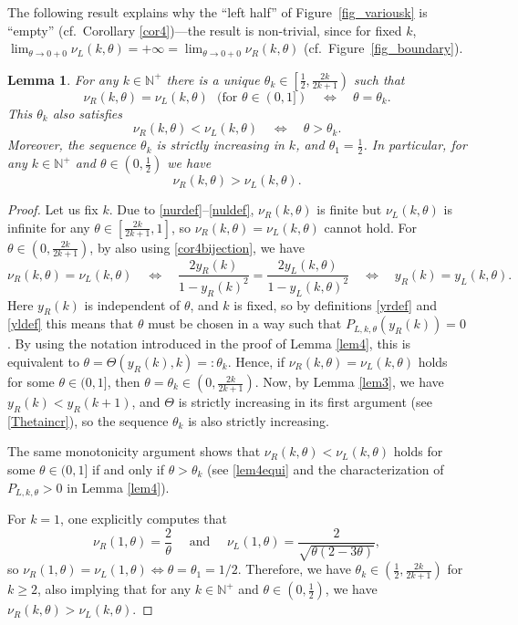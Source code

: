 \documentclass[smallextended,numbook,runningheads]{svjour3}     %
\newtheorem{lemma}{Lemma}
\newtheorem{lemma}{Lemma}
\newcommand{\te}{\theta}
\newcommand{\nul}{\nu_L(k,\theta)}
\newcommand{\nur}{\nu_R(k,\theta)}
\newcommand{\yl}{y_L(k,\theta)}
\newcommand{\yr}{y_R(k)}
\newcommand{\nplus}{\mathbb{N}^+}
\begin{document}
The following result explains why the ``left half'' of Figure~\ref{fig_variousk} is ``empty'' (cf.~Corollary \ref{cor4})---the result is non-trivial, since for fixed $k$, $\lim_{\te\to 0+0} \nul=+\infty=\lim_{\te\to 0+0} \nur$ (cf.~Figure~\ref{fig_boundary}).
\begin{lemma}\label{lem5} For any $k\in\nplus$ there is a unique $\te_k\in\left[\frac{1}{2},\frac{2k}{2k+1}\right)$  such that 
\[
\nur = \nul\ \ \  (\text{for } \te\in(0,1])\quad \Longleftrightarrow \quad \te= \te_k.
\]
This $\te_k$ also satisfies
\[
\nur < \nul\quad \Longleftrightarrow \quad \te> \te_k.
\]
Moreover, the sequence $\te_k$ is strictly increasing in $k$, and  $\te_1=\frac{1}{2}$. In particular, for any $k\in\nplus$ and $\te\in\left(0,\frac{1}{2}\right)$ we have 
\[
 \nur>\nul.
\] 
\end{lemma}
\begin{proof} Let us fix $k$. Due to \eqref{nurdef}--\eqref{nuldef}, $\nur$ is finite but $\nul$ is infinite for any $\te\in\left[\frac{2k}{2k+1},1\right]$, so $\nur = \nul$ cannot hold. For $\te\in\left(0,\frac{2k}{2k+1}\right)$, by also using \eqref{cor4bijection}, we have 
\[
\nur = \nul\quad \Longleftrightarrow \quad \frac{2\yr}{1-\yr^2}=\frac{2\yl}{1-\yl^2} \quad \Longleftrightarrow
\quad \yr=\yl.
\]
Here $\yr$ is independent of $\te$, and $k$ is fixed, so by definitions \eqref{yrdef} and \eqref{yldef} this means that $\te$ must be chosen in a way such that $P_{L,k,\te}(\yr)=0$. By using the notation introduced in the proof of Lemma \ref{lem4}, this is equivalent to $\te=\Theta(\yr,k)=:\te_k$. Hence, if $\nur = \nul$ holds for some $\te\in(0,1]$, then $\te=\te_k\in\left(0,\frac{2k}{2k+1}\right)$. Now, by Lemma \ref{lem3}, we have $\yr<y_R(k+1)$, and $\Theta$ is strictly increasing in its first argument (see \eqref{Thetaincr}), so the sequence $\te_k$ is also strictly increasing. 

The same monotonicity argument shows that $\nur < \nul$ holds for some $\te\in(0,1]$ if and only if $\te>\te_k$
(see \eqref{lem4equi} and the characterization of  $P_{L,k,\te}>0$ in Lemma \ref{lem4}). 

For $k=1$, one explicitly computes that
\begin{equation}\label{nurl1thetaconcrete}
\nu_R(1,\theta)=\frac{2}{\te}\quad\text{ and }\quad\nu_L(1,\theta)=\frac{2}{\sqrt{\theta  (2-3 \theta)}},
\end{equation}
so $\nu_R(1,\theta)=\nu_L(1,\theta) \Longleftrightarrow \te=\te_1=1/2$. Therefore, we have
$\te_k\in\left(\frac{1}{2},\frac{2k}{2k+1}\right)$ for $k\ge 2$, also implying that for any $k\in\nplus$ and 
$\te\in\left(0,\frac{1}{2}\right)$, we have $\nur>\nul$.
\end{proof}
\end{document}
